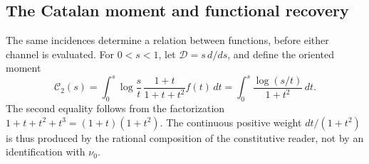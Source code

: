 \subsection{The Catalan moment and functional recovery}
\label{hmtfg:articulacion:catalan}

The same incidences determine a relation between functions,
before either channel is evaluated. For \(0<s<1\), let
\(\mathcal D=s\,d/ds\), and define the oriented moment
\begin{equation}
 \mathcal C_2(s)
 =\int_0^s\log\frac{s}{t}\,
     \frac{1+t}{1+t+t^2}f(t)\,dt
 =\int_0^s\frac{\log(s/t)}{1+t^2}\,dt.
 \label{hmtfg:articulacion:integral}
\end{equation}
The second equality follows from the factorization
\(1+t+t^2+t^3=(1+t)(1+t^2)\). The continuous positive weight
\(dt/(1+t^2)\) is thus produced by the rational composition
of the constitutive reader, not by an identification with
\(\nu_0\).


